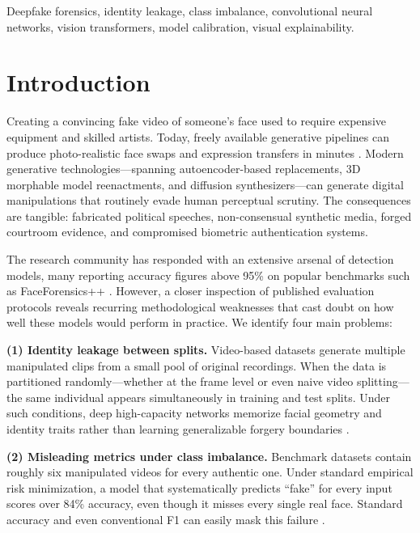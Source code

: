 \documentclass[conference]{IEEEtran}
\begin{document}
\begin{IEEEkeywords}
Deepfake forensics, identity leakage, class imbalance, convolutional neural networks, vision transformers, model calibration, visual explainability.
\end{IEEEkeywords}

\section{Introduction}
\label{sec:introduction}

Creating a convincing fake video of someone's face used to require expensive equipment and skilled artists. Today, freely available generative pipelines can produce photo-realistic face swaps and expression transfers in minutes \cite{rossler2019faceforensics, dong2023implicit}. Modern generative technologies---spanning autoencoder-based replacements, 3D morphable model reenactments, and diffusion synthesizers---can generate digital manipulations that routinely evade human perceptual scrutiny. The consequences are tangible: fabricated political speeches, non-consensual synthetic media, forged courtroom evidence, and compromised biometric authentication systems.

The research community has responded with an extensive arsenal of detection models, many reporting accuracy figures above 95\% on popular benchmarks such as FaceForensics++ \cite{rossler2019faceforensics}. However, a closer inspection of published evaluation protocols reveals recurring methodological weaknesses that cast doubt on how well these models would perform in practice. We identify four main problems:

\textbf{(1) Identity leakage between splits.} Video-based datasets generate multiple manipulated clips from a small pool of original recordings. When the data is partitioned randomly---whether at the frame level or even naive video splitting---the same individual appears simultaneously in training and test splits. Under such conditions, deep high-capacity networks memorize facial geometry and identity traits rather than learning generalizable forgery boundaries \cite{cozzolino2021idreveal, dong2023implicit}.

\textbf{(2) Misleading metrics under class imbalance.} Benchmark datasets contain roughly six manipulated videos for every authentic one. Under standard empirical risk minimization, a model that systematically predicts ``fake'' for every input scores over 84\% accuracy, even though it misses every single real face. Standard accuracy and even conventional F1 can easily mask this failure \cite{chicco2020advantages}.
\end{document}
